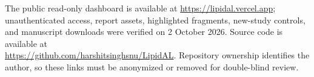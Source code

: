 The public read-only dashboard is available at
\url{https://lipidal.vercel.app}; unauthenticated access, report assets,
highlighted fragments, new-study controls, and manuscript downloads were
verified on 2 October 2026. Source code is available at\\
\url{https://github.com/harshitsinghsnu/LipidAL}.
Repository ownership identifies the author, so these links must be
anonymized or removed for double-blind review.
